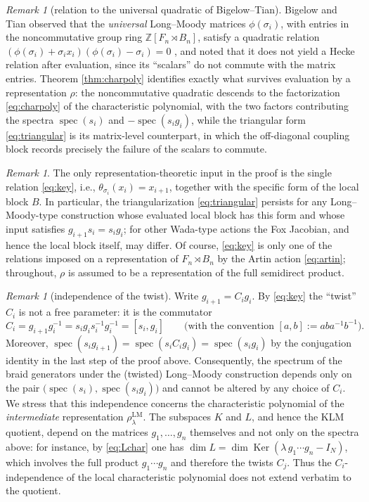 \documentclass[11pt]{article}
\theoremstyle{definition}
\theoremstyle{remark}
\newtheorem{remark}[theorem]{Remark}
\newcommand{\Ker}{\operatorname{Ker}}
\newcommand{\spec}{\operatorname{spec}}
\newcommand{\rLMl}{\rho^{\mathrm{LM}}_{\lambda}}
\begin{document}
\begin{remark}[relation to the universal quadratic of
Bigelow--Tian]\label{rem:universal}
Bigelow and Tian observed that the \emph{universal} Long--Moody matrices
$\phi(\sigma_i)$, with entries in the noncommutative group ring
$\mathbb{Z}[F_n \rtimes B_n]$, satisfy a quadratic relation
$(\phi(\sigma_i) + \sigma_i x_i)(\phi(\sigma_i) - \sigma_i) = 0$
\cite[Proposition 5.1]{BigelowTian08}, and noted that it does not yield a
Hecke relation after evaluation, since its ``scalars'' do not commute
with the matrix entries. Theorem \ref{thm:charpoly} identifies exactly
what survives evaluation by a representation $\rho$: the noncommutative
quadratic descends to the factorization \eqref{eq:charpoly} of the
characteristic polynomial, with the two factors contributing the spectra
$\spec(s_i)$ and $-\spec(s_i g_i)$, while the triangular form
\eqref{eq:triangular} is its matrix-level counterpart, in which the
off-diagonal coupling block records precisely the failure of the
scalars to commute.
\end{remark}

\begin{remark}\label{rem:onlykey}
The only representation-theoretic input in the proof is the single relation
\eqref{eq:key}, i.e., $\theta_{\sigma_i}(x_i) = x_{i+1}$, together with
the specific form of the local block $B$. In particular, the
triangularization \eqref{eq:triangular} persists for any
Long--Moody-type construction whose evaluated local block has this form
and whose input satisfies $g_{i+1} s_i = s_i g_i$; for other Wada-type
actions \cite{Wada92} the Fox Jacobian, and hence the local block
itself, may differ. Of course, \eqref{eq:key} is only
one of the relations imposed on a representation of $F_n \rtimes B_n$ by
the Artin action \eqref{eq:artin}; throughout, $\rho$ is assumed to be a
representation of the full semidirect product.
\end{remark}

\begin{remark}[independence of the twist]\label{rem:twist}
Write $g_{i+1} = C_i g_i$. By \eqref{eq:key} the ``twist'' $C_i$ is not a
free parameter: it is the commutator
\[
C_i = g_{i+1} g_i^{-1} = s_i g_i s_i^{-1} g_i^{-1} = [s_i, g_i]
\qquad \text{(with the convention } [a, b] := a b a^{-1} b^{-1}\text{)}.
\]
Moreover, $\spec(s_i g_{i+1}) = \spec(s_i C_i g_i) = \spec(s_i g_i)$ by
the conjugation identity in the last step of the proof above.
Consequently, the spectrum of the braid generators under the (twisted)
Long--Moody construction depends only on the pair
$\bigl(\spec(s_i), \spec(s_i g_i)\bigr)$ and cannot be altered by any
choice of $C_i$. We stress that this independence concerns the
characteristic polynomial of the \emph{intermediate} representation
$\rLMl$. The subspaces $K$ and $L$, and hence the KLM quotient, depend
on the matrices $g_1, \dots, g_n$ themselves and not only on the spectra
above: for instance, by \eqref{eq:Lchar} one has
$\dim L = \dim \Ker(\lambda\, g_1 \cdots g_n - I_N)$, which involves the
full product $g_1 \cdots g_n$ and therefore the twists $C_j$. Thus the
$C_i$-independence of the local characteristic polynomial does not
extend verbatim to the quotient.
\end{remark}
\end{document}
